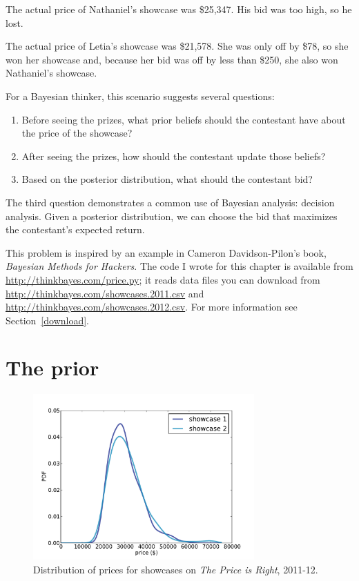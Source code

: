 \documentclass[12pt]{book}
\theoremstyle{exercise}
\begin{document}
The actual price of Nathaniel's showcase was \$25,347.  His bid
was too high, so he lost.

The actual price of Letia's showcase was \$21,578.  She was only
off by \$78, so she won her showcase and, because
her bid was off by less than \$250, she also won Nathaniel's
showcase.

For a Bayesian thinker, this scenario suggests several questions:

\begin{enumerate}

\item Before seeing the prizes, what prior beliefs should the
  contestant have about the price of the showcase?

\item After seeing the prizes, how should the contestant update
  those beliefs?

\item Based on the posterior distribution, what should the
  contestant bid?

\end{enumerate}

The third question demonstrates a common use of Bayesian analysis:
decision analysis.  Given a posterior distribution, we can choose
the bid that maximizes the contestant's expected return.

This problem is inspired by an example in Cameron Davidson-Pilon's
book, {\it Bayesian Methods for Hackers}.  The code I wrote for this
chapter is available from \url{http://thinkbayes.com/price.py}; it
reads data files you can download from
\url{http://thinkbayes.com/showcases.2011.csv} and
\url{http://thinkbayes.com/showcases.2012.csv}.    For more information
see Section~\ref{download}.


\section{The prior}

\begin{figure}
\centerline{\includegraphics[height=2.5in]{figs/price1.pdf}}
\caption{Distribution of prices for showcases on
{\it The Price is Right}, 2011-12.}
\label{fig.price1}
\end{figure}
\end{document}
